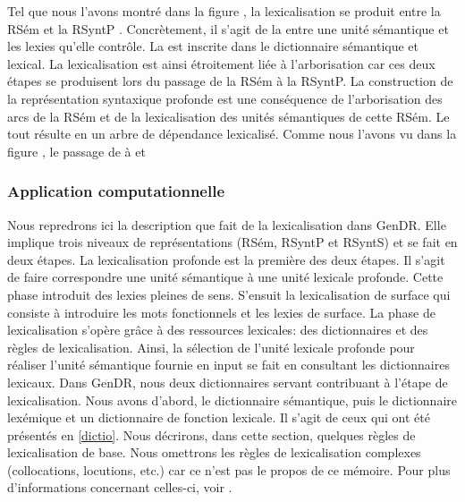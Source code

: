 Tel que nous l'avons montré dans la figure , la lexicalisation se produit entre la RSém et la RSyntP \citep{PolguereStructurationmisejeu1990}. Concrètement, il s'agit de la  entre une unité sémantique et les lexies qu'elle contrôle. La  est inscrite dans le dictionnaire sémantique et lexical. La lexicalisation est ainsi étroitement liée à l'arborisation car ces deux étapes se produisent lors du passage de la RSém à la RSyntP. La construction de la représentation syntaxique profonde est une conséquence de l'arborisation des arcs de la RSém et de la lexicalisation des unités sémantiques de cette RSém. Le tout résulte en un arbre de dépendance lexicalisé. Comme nous l'avons vu dans la figure , le passage de  à  et  

\subsubsection{Application computationnelle}

Nous repredrons ici la description que \cite{lareau18} fait de la lexicalisation dans GenDR. Elle implique trois niveaux de représentations (RSém, RSyntP et RSyntS) et se fait en deux étapes. La lexicalisation profonde est la première des deux étapes. Il s'agit de faire correspondre une unité sémantique à une unité lexicale profonde. Cette phase introduit des lexies pleines de sens. S'ensuit la lexicalisation de surface qui consiste à introduire les mots fonctionnels et les lexies de surface. La phase de lexicalisation s'opère grâce à des ressources lexicales: des dictionnaires et des règles de lexicalisation. Ainsi, la sélection de l'unité lexicale profonde pour réaliser l'unité sémantique fournie en input se fait en consultant les dictionnaires lexicaux. Dans GenDR, nous deux dictionnaires servant contribuant à l'étape de lexicalisation. Nous avons d'abord, le dictionnaire sémantique, puis le dictionnaire lexémique et un dictionnaire de fonction lexicale. Il s'agit de ceux qui ont été présentés en \ref{dictio}.  Nous décrirons, dans cette section, quelques règles de lexicalisation de base. Nous omettrons les règles de lexicalisation complexes (collocations, locutions, etc.) car ce n'est pas le propos de ce mémoire. Pour plus d'informations concernant celles-ci, voir \cite{lambrey15,LambreyImplementationcollocationspour2017,dubinskaite17,lareau18}.

